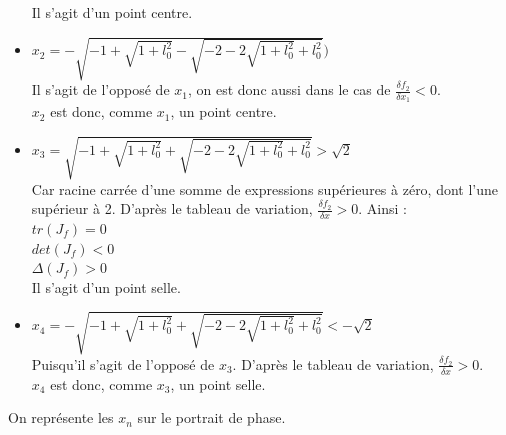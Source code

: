 \documentclass[10pt,a4paper]{article}
\begin{document}
\begin{itemize}
Il s'agit d'un point centre.
\item $x_2=-\sqrt{-1+\sqrt{1+l_0^2}-\sqrt{-2-2\sqrt{1+l_0^2}+l_0^2}})$\\
Il s'agit de l'opposé de $x_1$, on est donc aussi dans le cas de $\frac{\delta f_2}{\delta x_1}<0$.\\
$x_2$ est donc, comme $x_1$, un point centre.
\item $x_3=\sqrt{-1+\sqrt{1+l_0^2}+\sqrt{-2-2\sqrt{1+l_0^2}+l_0^2}}>\sqrt{2}$\\
Car racine carrée d'une somme de expressions supérieures à zéro, dont l'une supérieur à 2.
D'après le tableau de variation, $\frac{\delta f_2}{\delta x}>0$. Ainsi :\\
$tr(J_f) = 0 $\\
$det(J_f) < 0 $\\
$\Delta(J_f) > 0$\\
Il s'agit d'un point selle.
\item $x_4=-\sqrt{-1+\sqrt{1+l_0^2}+\sqrt{-2-2\sqrt{1+l_0^2}+l_0^2}}<-\sqrt{2}$\\
Puisqu'il s'agit de l'opposé de $x_3$.
D'après le tableau de variation, $\frac{\delta f_2}{\delta x}>0$.\\
$x_4$ est donc, comme $x_3$, un point selle.\\
\end{itemize}
On représente les $x_n$ sur le portrait de phase.
\end{document}
